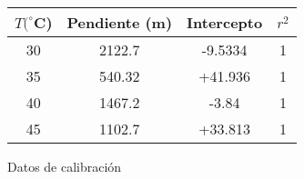 \begin{figure}[H]
    \centering
\begin{tabular}{cccc}
\hline
$ T (^{\circ}$C) & Pendiente (m) & Intercepto & $r^{2}$ \\
\hline
30 & 2122.7 & -9.5334  & 1   \\
35 & 540.32 & +41.936  & 1   \\
40 & 1467.2 & -3.84    & 1   \\
45 & 1102.7 & +33.813  & 1   \\
\hline

\end{tabular} 
\caption{Datos  de calibración }
    \label{fig:my_label}
\end{figure}
